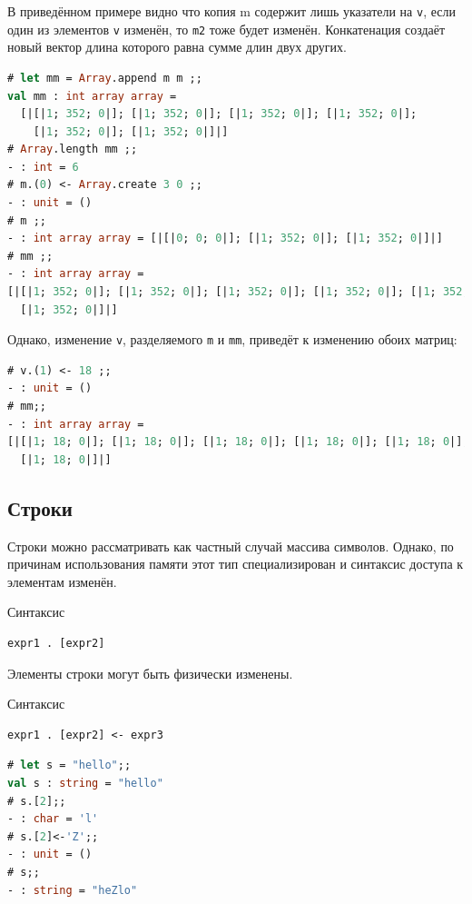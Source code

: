 В приведённом примере видно что копия m содержит лишь указатели на \texttt{v},
если один из элементов \texttt{v} изменён, то \texttt{m2} тоже будет изменён.
Конкатенация создаёт новый вектор длина которого равна сумме длин двух других.

\begin{lstlisting}[language=OCaml]
# let mm = Array.append m m ;;
val mm : int array array =
  [|[|1; 352; 0|]; [|1; 352; 0|]; [|1; 352; 0|]; [|1; 352; 0|];
    [|1; 352; 0|]; [|1; 352; 0|]|]
# Array.length mm ;;
- : int = 6
# m.(0) <- Array.create 3 0 ;;
- : unit = ()
# m ;;
- : int array array = [|[|0; 0; 0|]; [|1; 352; 0|]; [|1; 352; 0|]|]
# mm ;;
- : int array array =
[|[|1; 352; 0|]; [|1; 352; 0|]; [|1; 352; 0|]; [|1; 352; 0|]; [|1; 352; 0|];
  [|1; 352; 0|]|]
\end{lstlisting}

Однако, изменение \texttt{v}, разделяемого \texttt{m} и \texttt{mm}, приведёт к
изменению обоих матриц:

\begin{lstlisting}[language=OCaml]
# v.(1) <- 18 ;;
- : unit = ()
# mm;;
- : int array array =
[|[|1; 18; 0|]; [|1; 18; 0|]; [|1; 18; 0|]; [|1; 18; 0|]; [|1; 18; 0|];
  [|1; 18; 0|]|]
\end{lstlisting}

\subsection{Строки}

Строки можно рассматривать как частный случай массива символов. Однако, по
причинам использования памяти этот тип специализирован и синтаксис доступа к
элементам изменён.

Синтаксис

\begin{lstlisting}[language=OCaml]
expr1 . [expr2]
\end{lstlisting}

Элементы строки могут быть физически изменены.

Синтаксис

\begin{lstlisting}[language=OCaml]
expr1 . [expr2] <- expr3
\end{lstlisting}

\begin{lstlisting}[language=OCaml]
# let s = "hello";;
val s : string = "hello"
# s.[2];;
- : char = 'l'
# s.[2]<-'Z';;
- : unit = ()
# s;;
- : string = "heZlo"
\end{lstlisting}

